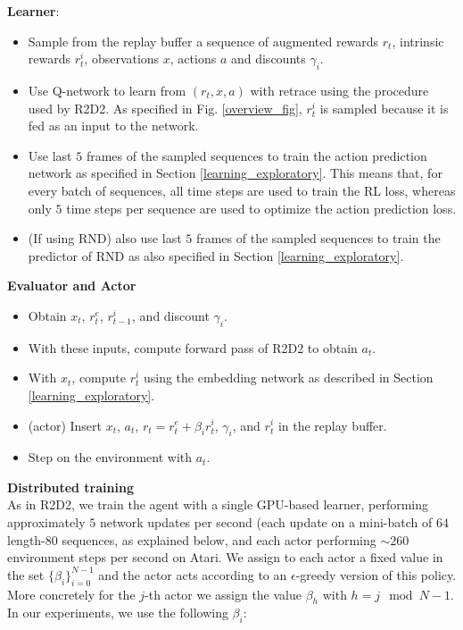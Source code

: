 \documentclass{article} %
\begin{document}
\textbf{Learner}:

\begin{itemize}
    \item Sample from the replay buffer a sequence of augmented rewards $r_t$, intrinsic rewards $r^i_t$, observations $x$, actions $a$ and discounts $\gamma_i$.
    \item Use Q-network to learn from $(r_t, x, a)$ with retrace using the procedure used by R2D2. As specified in Fig. \ref{overview_fig}, $r^i_t$ is sampled because it is fed as an input to the network.
    \item Use last $5$ frames of the sampled sequences to train the action prediction network as specified in Section \ref{learning_exploratory}. This means that, for every batch of sequences, all time steps are used to train the RL loss, whereas only $5$ time steps per sequence are used to optimize the action prediction loss.
    \item (If using RND) also use last $5$ frames of the sampled sequences to train the predictor of RND as also specified in Section \ref{learning_exploratory}.
\end{itemize}

\textbf{Evaluator and Actor}
\begin{itemize}
    \item Obtain $x_t$, $r_t^e$, $r_{t-1}^{i}$, and discount $\gamma_i$.
    \item With these inputs, compute forward pass of R2D2 to obtain $a_t$.
    \item With $x_t$, compute $r_t^i$ using the embedding network as described in Section \ref{learning_exploratory}.
    \item (actor) Insert $x_t$, $a_t$, $r_t = r^e_t + \beta_i r_{t}^{i}$, $\gamma_i$, and $r_{t}^{i}$ in the replay buffer.
    \item Step on the environment with $a_t$.
\end{itemize}

\textbf{Distributed training}\\[2ex]
As in R2D2, we train the agent with a single GPU-based learner, performing approximately $5$ network updates per second (each update on a mini-batch of $64$ length-$80$ sequences, as explained below, and each actor performing $\sim 260$ environment steps per second on Atari. 
%
We assign to each actor a fixed value in the set $\{\beta_i\}_{i=0}^{N-1}$ and the actor acts according to an $\epsilon$-greedy version of this policy. More concretely for the $j$-th actor we assign the value $\beta_{h}$ with $h=j\mod{N-1}$. In our experiments, we use the following $\beta_i$:
\end{document}
